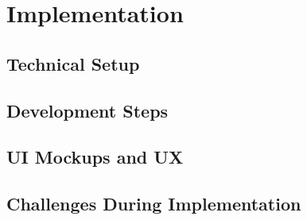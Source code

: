\chapter{Implementation}
\label{chap:Implementation}

\section{Technical Setup}

\section{Development Steps}

\section{UI Mockups and UX}

\section{Challenges During Implementation}
